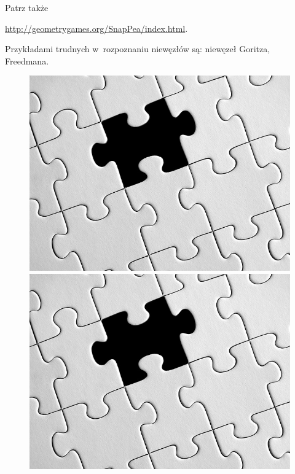 Patrz także {\url{http://geometrygames.org/SnapPea/index.html}.

Przykładami trudnych w~rozpoznaniu niewęzłów są: niewęzeł Goritza, Freedmana.

\begin{figure}[H]
    \begin{minipage}[b]{.32\linewidth}
        \centering
        \includegraphics[width=\linewidth]{../data/missing.jpg}
    \end{minipage}
    \begin{minipage}[b]{.32\linewidth}
        \centering
        \includegraphics[width=\linewidth]{../data/missing.jpg}
    \end{minipage}

\end{figure}}
